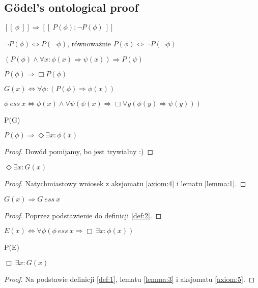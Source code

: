 \subsection{G\"odel's ontological proof}
\kant[9]
\begin{assumption} \label{ass:1}
	$ [\![ \ \phi \ ]\!] \Longrightarrow [\![ \ P(\phi); \neg P(\phi) \ ]\!]$
\end{assumption}
\begin{axiom}[Dualność] \label{axiom:1}
	$\neg P(\phi) \Leftrightarrow P(\neg \phi)$, równoważnie $P(\phi) \Leftrightarrow \neg P(\neg \phi)$
\end{axiom}
\begin{axiom}[Całkowitość] \label{axiom:2}
	$ \left( P(\phi) \wedge \forall x: \phi(x) \Rightarrow \psi(x) \right) \Rightarrow P(\psi) $
\end{axiom}
\begin{axiom}[Absolutność] \label{axiom:3}
	$ P(\phi) \Rightarrow \Box P(\phi) $
\end{axiom}
\begin{definition} \label{def:1}
	$ G(x) \Leftrightarrow \forall \phi: \left( P(\phi) \Rightarrow \phi(x) \right) $
\end{definition}
\begin{definition} \label{def:2}
	$ \phi \ ess \ x \Leftrightarrow \phi(x) \wedge \forall \psi \left( \psi(x) \Rightarrow \Box \forall y \left( \phi(y) \Rightarrow \psi(y) \right) \right)  $
\end{definition}
\begin{axiom} \label{axiom:4}
	P(G)
\end{axiom}
\begin{lemma} \label{lemma:1}
	$ P(\phi) \Rightarrow \Diamond \exists x : \phi(x) $
\end{lemma}
\begin{proof}
	Dowód pomijamy, bo jest trywialny :)
\end{proof}
\begin{lemma} \label{lemma:2}
	$ \Diamond \exists x : G(x) $
\end{lemma}
\begin{proof}
	Natychmiastowy wniosek z aksjomatu \ref{axiom:4} i lematu \ref{lemma:1}.
\end{proof}
\begin{lemma} \label{lemma:3}
	$ G(x) \Rightarrow G \ ess \ x $
\end{lemma}
\begin{proof}
	Poprzez podstawienie do definicji \ref{def:2}. 
\end{proof}
\begin{definition} \label{def:3}
	$ E(x) \Leftrightarrow \forall \phi \left( \phi \ ess \ x \Rightarrow \Box\ \exists x: \phi(x) \right) $
\end{definition}
\begin{axiom} \label{axiom:5}
	P(E)
\end{axiom}
\begin{theorem}
	$ \Box\ \exists x : G(x) $
\end{theorem}
\begin{proof}
	Na podstawie definicji \ref{def:1}, lematu \ref{lemma:3} i aksjomatu \ref{axiom:5}. 
\end{proof}